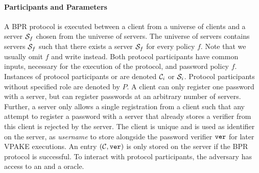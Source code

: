 \paragraph{Participants and Parameters}
A \ac{BPR} protocol is executed between a client \Client from a universe of clients and a server $\mathcal{S}_f$ chosen from the universe of servers.
The universe of servers contains servers $\mathcal{S}_f$ such that there exists a server $\mathcal{S}_f$ for every policy $f$.
Note that we usually omit $f$ and write \Server instead.
Both protocol participants have common inputs, necessary for the execution of the protocol, and password policy $f$.
Instances of protocol participants \Client or \Server are denoted $\mathcal{C}_i$ or $\mathcal{S}_i$. 
Protocol participants without specified role are denoted by $P$.
A client can only register one password with a server, but can register passwords at an arbitrary number of servers.
Further, a server only allows a single registration from a client such that any attempt to register a password with a server that already stores a verifier from this client is rejected by the server.
The client \Client is unique and is used as identifier on the server, \ie as \emph{username} to store alongside the password verifier $\mathtt{ver}$ for later \ac{VPAKE} executions.
An entry $(\mathcal{C},\mathtt{ver})$ is only stored on the server if the \ac{BPR} protocol is successful.
%
%
%
To interact with protocol participants, the adversary has access to an \Execute and a \Send oracle.

